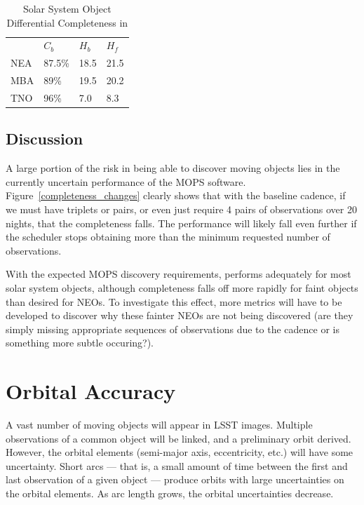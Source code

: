 \begin{table}[]
\centering
\caption{Solar System Object Differential Completeness in }
\label{ssoperf}
\begin{tabular}{llll}
    & $C_b$ & $H_b$ & $H_f$ \\
NEA & 87.5\%  & 18.5  & 21.5  \\
MBA & 89\%  & 19.5  & 20.2  \\
TNO & 96\%  & 7.0   & 8.3 
\end{tabular}
\end{table}




\subsection{Discussion}
\label{sec:\secname:discussion}

A large portion of the risk in being able to discover moving objects
lies in the currently uncertain performance of the MOPS
software. Figure~\ref{completeness_changes} clearly shows that with
the baseline cadence, if we must have triplets or pairs, or even just
require 4 pairs of observations over 20 nights, that the completeness
falls. The performance will likely fall even further if the scheduler
stops obtaining more than the minimum requested number of observations.

With the expected MOPS discovery requirements,
 performs adequately for most solar system
objects, although completeness falls off more rapidly for faint
objects than desired for NEOs. To investigate this effect, more
metrics will have to be developed to discover why these fainter NEOs
are not being discovered (are they simply missing appropriate
sequences of observations due to the cadence or is something more
subtle occuring?). 

\navigationbar


\section{Orbital Accuracy}
\def\secname{\chpname:orbits}\label{sec:\secname}

A vast number of moving objects will appear in
LSST images. Multiple observations of a common
object will be linked, and a preliminary orbit
derived. However, 
the orbital elements (semi-major axis, 
eccentricity, etc.) will have some uncertainty.
Short arcs --- that is, a small amount of time
between the first and last observation of a given
object --- produce orbits with large uncertainties
on the orbital elements. As arc length grows,
the orbital uncertainties decrease.

